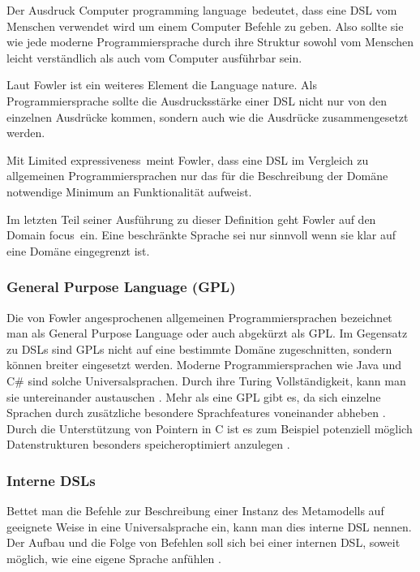 \documentclass[12pt,oneside,a4paper,parskip]{scrbook}
\begin{document}
Der Ausdruck \glqq Computer programming language\grqq\ bedeutet, dass eine DSL vom Menschen verwendet wird um einem Computer Befehle zu geben. Also sollte sie wie jede moderne Programmiersprache durch ihre Struktur sowohl vom Menschen leicht verständlich als auch vom Computer ausführbar sein.

Laut Fowler ist ein weiteres Element die \glqq Language nature\grqq. Als Programmiersprache sollte die Ausdrucksstärke einer DSL nicht nur von den einzelnen Ausdrücke kommen, sondern auch wie die Ausdrücke zusammengesetzt werden. 

Mit \glqq Limited expressiveness\grqq\ meint Fowler, dass eine DSL im Vergleich zu allgemeinen Programmiersprachen nur das für die Beschreibung der Domäne notwendige Minimum an Funktionalität aufweist. 

Im letzten Teil seiner Ausführung zu dieser Definition geht Fowler auf den \glqq Domain focus\grqq\ ein. Eine beschränkte Sprache sei nur sinnvoll wenn sie klar auf eine Domäne eingegrenzt ist.

\subsubsection{General Purpose Language (GPL)}

Die von Fowler angesprochenen allgemeinen Programmiersprachen bezeichnet man als General Purpose Language oder auch abgekürzt als GPL. Im Gegensatz zu DSLs sind GPLs nicht auf eine bestimmte Domäne zugeschnitten, sondern können breiter eingesetzt werden. Moderne Programmiersprachen wie Java und C\# sind solche Universalsprachen. Durch ihre Turing Vollständigkeit, kann man sie untereinander austauschen \cite[S. 111]{hromkovic2014}. Mehr als eine GPL gibt es, da sich einzelne Sprachen durch zusätzliche besondere Sprachfeatures voneinander abheben \cite[S. 27]{voelter2013}. Durch die Unterstützung von Pointern in C ist es zum Beispiel potenziell möglich Datenstrukturen besonders speicheroptimiert anzulegen \cite[S. 93ff.]{kernighan1988}.

\subsubsection{Interne DSLs}

Bettet man die Befehle zur Beschreibung einer Instanz des Metamodells auf geeignete Weise in eine Universalsprache ein, kann man dies interne DSL nennen. Der Aufbau und die Folge von Befehlen soll sich bei einer internen DSL, soweit möglich, wie eine eigene Sprache anfühlen \cite[S 28]{fowler2010}.
\end{document}
